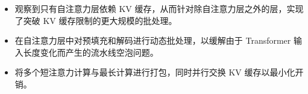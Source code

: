 

\begin{itemize}[nosep]
  \item 观察到只有自注意力层依赖 KV 缓存，从而针对除自注意力层之外的层，实现了突破 KV 缓存限制的更大规模的批处理。
  \item 在自注意力层中对预填充和解码进行动态批处理，以缓解由于 Transformer 输入长度变化而产生的流水线空泡问题。
  \item 将多个短注意力计算与最长计算进行打包，同时并行交换 KV 缓存以最小化开销。
\end{itemize}
